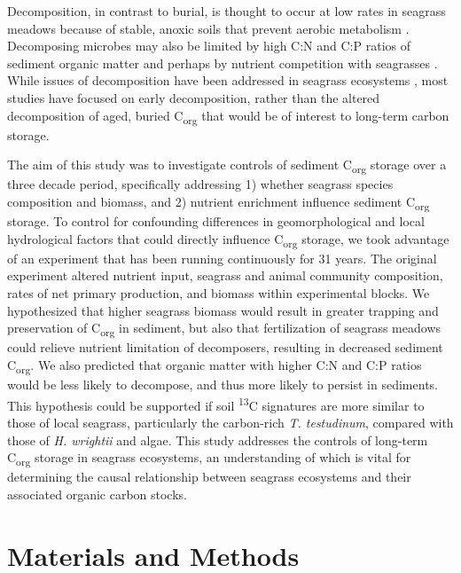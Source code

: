 Decomposition, in contrast to burial, is thought to occur at low rates in seagrass meadows because of stable, anoxic soils that prevent aerobic metabolism \citep{Duarte:2010dx, Fourqurean:2012cv}. Decomposing microbes may also be limited by high C:N and C:P ratios of sediment organic matter and perhaps by nutrient competition with seagrasses \citep{Enriquez:1993ul, Lopez:1995uo, Lopez:1998ty}. While issues of decomposition have been addressed in seagrass ecosystems \citep{Harrison:1989tp, Mateo:2006wk}, most studies have focused on early decomposition, rather than the altered decomposition of aged, buried C\textsubscript{org} that would be of interest to long-term carbon storage.

The aim of this study was to investigate controls of sediment C\textsubscript{org} storage over a three decade period, specifically addressing 1) whether seagrass species composition and biomass, and 2) nutrient enrichment influence sediment C\textsubscript{org} storage. To control for confounding differences in geomorphological and local hydrological factors that could directly influence C\textsubscript{org} storage, we took advantage of an experiment that has been running continuously for 31 years. The original experiment altered nutrient input, seagrass and animal community composition, rates of net primary production, and biomass within experimental blocks. We hypothesized that higher seagrass biomass would result in greater trapping and preservation of C\textsubscript{org} in sediment, but also that fertilization of seagrass meadows could relieve nutrient limitation of decomposers, resulting in decreased sediment C\textsubscript{org}. We also predicted that organic matter with higher C:N and C:P ratios would be less likely to decompose, and thus more likely to persist in sediments. This hypothesis could be supported if soil \textsuperscript{13}C signatures are more similar to those of local seagrass, particularly the carbon-rich \textit{T. testudinum}, compared with those of \textit{H. wrightii} and algae. This study addresses the controls of long-term C\textsubscript{org} storage in seagrass ecosystems, an understanding of which is vital for determining the causal relationship between seagrass ecosystems and their associated organic carbon stocks.



\section{Materials and Methods}

